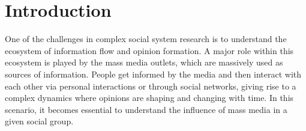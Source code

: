 \documentclass{bmcart}
\begin{document}



\section*{Introduction}


\par One of the challenges in  complex social system research is to understand the ecosystem of information flow and opinion formation. 
A major role within this ecosystem is played by the mass media outlets, which are massively used as sources of information.
People get informed by the media and then interact with each other  via personal interactions or through social networks, giving rise to a complex dynamics where opinions are shaping and changing with time. 
In this scenario, it becomes essential to understand the influence of mass media in a given social group.
\end{document}
